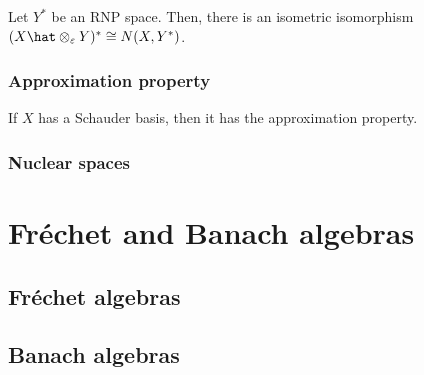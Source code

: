 \documentclass{../../large}
\begin{document}
\begin{prb}
Let $Y^*$ be an RNP space.
Then, there is an isometric isomorphism $(X\hat\otimes_\e Y)^*\cong N(X,Y^*)$.
\end{prb}

\section{Approximation property}

\begin{prb}
\end{prb}

\begin{prb}
\end{prb}

\begin{prb}
\end{prb}

\begin{prb}
\begin{parts}
\item If $X$ has a Schauder basis, then it has the approximation property.
\end{parts}
\end{prb}



\section{Nuclear spaces}



\part{Fr\'echet and Banach algebras}

\chapter{Fr\'echet algebras}

\chapter{Banach algebras}
\end{document}
